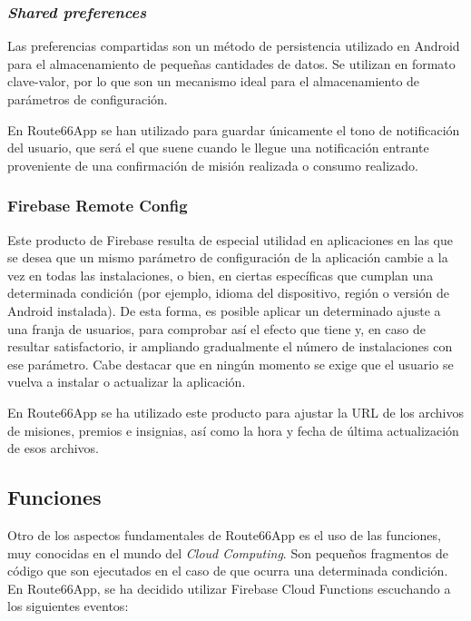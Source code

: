 \documentclass[twoside]{report}
\begin{document}
\subsubsection{\textit{Shared preferences}}

Las preferencias compartidas son un método de persistencia utilizado en Android para el almacenamiento de pequeñas cantidades de datos. Se utilizan en formato clave-valor, por lo que son un mecanismo ideal para el almacenamiento de parámetros de configuración.

En Route66App se han utilizado para guardar únicamente el tono de notificación del usuario, que será el que suene cuando le llegue una notificación entrante proveniente de una confirmación de misión realizada o consumo realizado.

\subsubsection{Firebase Remote Config}

Este producto de Firebase resulta de especial utilidad en aplicaciones en las que se desea que un mismo parámetro de configuración de la aplicación cambie a la vez en todas las instalaciones, o bien, en ciertas específicas que cumplan una determinada condición (por ejemplo, idioma del dispositivo, región o versión de Android instalada). De esta forma, es posible aplicar un determinado ajuste a una franja de usuarios, para comprobar así el efecto que tiene y, en caso de resultar satisfactorio, ir ampliando gradualmente el número de instalaciones con ese parámetro. Cabe destacar que en ningún momento se exige que el usuario se vuelva a instalar o actualizar la aplicación.

En Route66App se ha utilizado este producto para ajustar la URL de los archivos de misiones, premios e insignias, así como la hora y fecha de última actualización de esos archivos.

\subsection{Funciones}

Otro de los aspectos fundamentales de Route66App es el uso de las funciones, muy conocidas en el mundo del \textit{Cloud Computing}. Son pequeños fragmentos de código que son ejecutados en el caso de que ocurra una determinada condición. En Route66App, se ha decidido utilizar Firebase Cloud Functions escuchando a los siguientes eventos:
\end{document}
